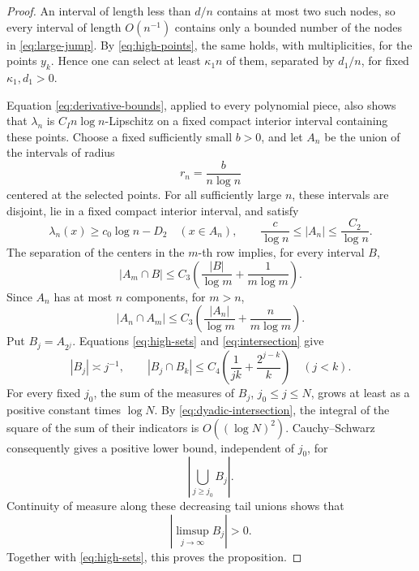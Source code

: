 \documentclass[11pt]{article}
\numberwithin{equation}{section}
\begin{document}
\begin{proof}
An interval of length less than \(d/n\) contains at most two such nodes, so
every interval of length \(O(n^{-1})\) contains only a bounded number of the
nodes in \eqref{eq:large-jump}. By \eqref{eq:high-points}, the same holds,
with multiplicities, for the points \(y_k\). Hence one can select at least
\(\kappa_1n\) of them, separated by \(d_1/n\), for fixed
\(\kappa_1,d_1>0\).

Equation \eqref{eq:derivative-bounds}, applied to every polynomial piece, also
shows that \(\lambda_n\) is \(C_In\log n\)-Lipschitz on a fixed compact
interior interval containing these points. Choose a fixed sufficiently small
\(b>0\), and let \(A_n\) be the union of the intervals of radius
\[
 r_n=\frac{b}{n\log n}
\]
centered at the selected points. For all sufficiently large \(n\), these
intervals are disjoint, lie in a fixed compact interior interval, and satisfy
\begin{equation}\label{eq:high-sets}
 \lambda_n(x)\ge c_0\log n-D_2\quad(x\in A_n),\qquad
 \frac{c}{\log n}\le |A_n|\le\frac{C_2}{\log n}.
\end{equation}
The separation of the centers in the \(m\)-th row implies, for every interval
\(B\),
\[
 |A_m\cap B|\le C_3\left(\frac{|B|}{\log m}
                              +\frac1{m\log m}\right).
\]
Since \(A_n\) has at most \(n\) components, for \(m>n\),
\begin{equation}\label{eq:intersection}
 |A_n\cap A_m|
 \le C_3\left(\frac{|A_n|}{\log m}
                              +\frac{n}{m\log m}\right).
\end{equation}
Put \(B_j=A_{2^j}\). Equations \eqref{eq:high-sets} and
\eqref{eq:intersection} give
\begin{equation}\label{eq:dyadic-intersection}
 |B_j|\asymp j^{-1},\qquad
 |B_j\cap B_k|\le C_4\left(\frac1{jk}+\frac{2^{j-k}}k\right)
 \quad(j<k).
\end{equation}
For every fixed \(j_0\), the sum of the measures of \(B_j\), \(j_0\le j\le
N\), grows at least as a positive constant times \(\log N\). By
\eqref{eq:dyadic-intersection}, the integral of the square of the sum of their
indicators is \(O((\log N)^2)\). Cauchy--Schwarz consequently gives a positive
lower bound, independent of \(j_0\), for
\[
 \left|\bigcup_{j\ge j_0}B_j\right|.
\]
Continuity of measure along these decreasing tail unions shows that
\begin{equation}\label{eq:recurrence}
 |\limsup_{j\to\infty}B_j|>0.
\end{equation}
Together with \eqref{eq:high-sets}, this proves the proposition.
\end{proof}
\end{document}
